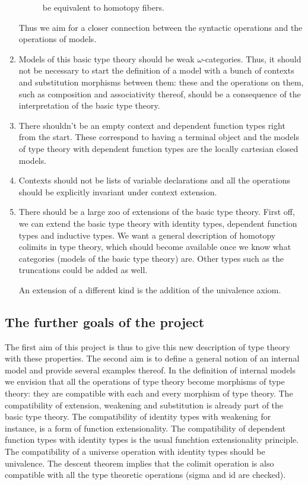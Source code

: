 \begin{enumerate}
\begin{description}
      be equivalent to homotopy fibers.
      \end{description}
      Thus we aim for a closer connection between the syntactic operations and
      the operations of models.
\item Models of this basic type theory should be weak $\omega$-categories. Thus,
      it should not be necessary to start the definition of a model with a bunch
      of contexts and substitution morphisms between them: these and the
      operations on them, such as composition and associativity thereof, should
      be a consequence of the interpretation of the basic type theory.
\item There shouldn't be an empty context and dependent function types right
      from the start. These correspond to having a terminal object and the
      models of type theory with dependent function types are the locally
      cartesian closed models.
\item Contexts should not be lists of variable declarations and all the
      operations should be explicitly invariant under context extension.
\item There should be a large zoo of extensions of the basic type theory. First
      off, we can extend the basic type theory with identity types, dependent
      function types and inductive types. We want a general description of
      homotopy colimits in type theory, which should become available once we
      know what categories (models of the basic type theory) are. Other types
      such as the truncations could be added as well.
      
      An extension of a different kind is the addition of the univalence axiom.
\end{enumerate}

\subsection{The further goals of the project}
The first aim of this project is thus to give this new description of type
theory with these properties. The second aim is to define a general notion of
an internal model and provide several examples thereof. In the definition of
internal models we envision that all the operations of type theory become
morphisms of type theory: they are compatible with each and every morphism
of type theory. The compatibility of extension, weakening and substitution is
already part of the basic type theory. The compatibility of identity types
with weakening for instance, is a form of function extensionality. The 
compatibility of dependent function types with identity types is the usual
funchtion extensionality principle. The
compatibility of a universe operation with identity types should be univalence.
The descent theorem implies that the colimit operation is also compatible with
all the type theoretic operations (sigma and id are checked).

